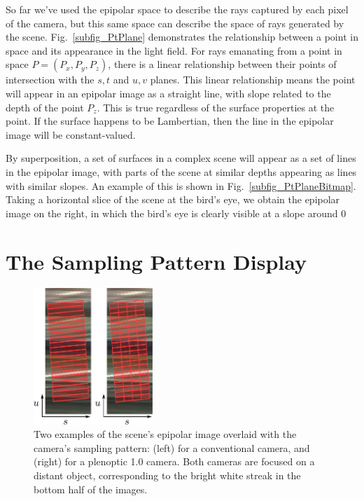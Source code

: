 \documentclass[onecolumn]{article}
\begin{document}
So far we've used the epipolar space to describe the rays captured by each pixel of the camera, but this same space can describe the space of rays generated by the scene. Fig.~\ref{subfig_PtPlane} demonstrates the relationship between a point in space and its appearance in the light field.  For rays emanating from a point in space $P = (P_x,P_y,P_z)$, there is a linear relationship between their points of intersection with the $s,t$ and $u,v$ planes.  This linear relationship means the point will appear in an epipolar image as a straight line, with slope related to the depth of the point $P_z$.  This is true regardless of the surface properties at the point.  If the surface happens to be Lambertian, then the line in the epipolar image will be constant-valued.  

By superposition, a set of surfaces in a complex scene will appear as a set of lines in the epipolar image, with parts of the scene at similar depths appearing as lines with similar slopes.  An example of this is shown in Fig.~\ref{subfig_PtPlaneBitmap}.  Taking a horizontal slice of the scene at the bird's eye, we obtain the epipolar image on the right, in which the bird's eye is clearly visible at a slope around $0$

\section{The Sampling Pattern Display}
\label{sect_SampPatSceneAndCam}

\begin{figure}
	\centering
	\includegraphics[width=0.4\textwidth]{Figs/SceneAndCamSU}
	\caption{Two examples of the scene's epipolar image overlaid with the camera's sampling pattern: (left) for a conventional camera, and (right) for a plenoptic 1.0 camera. Both cameras are focused on a distant object, corresponding to the bright white streak in the bottom half of the images.}
	\label{fig_SampPatSceneAndCam}
\end{figure}
\end{document}
